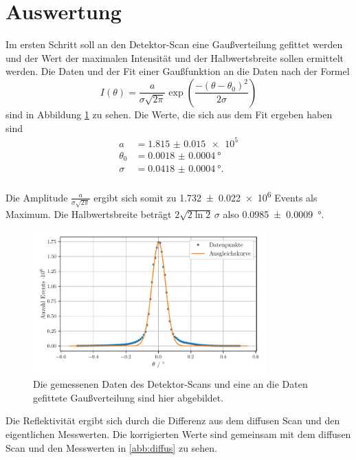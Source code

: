 \section{Auswertung}
\label{sec:Auswertung}

Im ersten Schritt soll an den Detektor-Scan eine Gaußverteilung gefittet werden und der Wert der maximalen Intensität und der Halbwertsbreite sollen ermittelt werden.
Die Daten und der Fit einer Gaußfunktion an die Daten nach der Formel 
\begin{equation*}
    I(\theta) = \frac{a}{\sigma\sqrt{2\pi}} \exp\left( \frac{-\left( \theta - \theta_0\right)^2}{2 \sigma} \right)
\end{equation*} sind in Abbildung \ref{abb:detector} zu sehen.
Die Werte, die sich aus dem Fit ergeben haben sind
\begin{align*}
a &= \num{1.815(15)e5} \\
\theta_0 &= \SI{0.0018(4)}{\degree} \\
\sigma &= \SI{0.0418(4)}{\degree}. \\
\end{align*}

Die Amplitude $ \frac{a}{\sigma\sqrt{2\pi}}$ ergibt sich somit zu \num{1.732(22)e6} Events als Maximum. 
Die Halbwertsbreite beträgt $2 \sqrt{2 \ln 2} \, \sigma$ also \SI{0.0985(9)}{\degree}.
\begin{figure}
    \centering
    \includegraphics[width=0.8\textwidth]{figures/detector_scan.pdf}
    \caption{Die gemessenen Daten des Detektor-Scans und eine an die Daten gefittete Gaußverteilung sind hier abgebildet.}
    \label{abb:detector}
\end{figure}

Die Reflektivität ergibt sich durch die Differenz aus dem diffusen Scan und den eigentlichen Messwerten. Die korrigierten Werte sind gemeinsam mit dem diffusen Scan und den Messwerten in \ref{abb:diffus} zu sehen.

